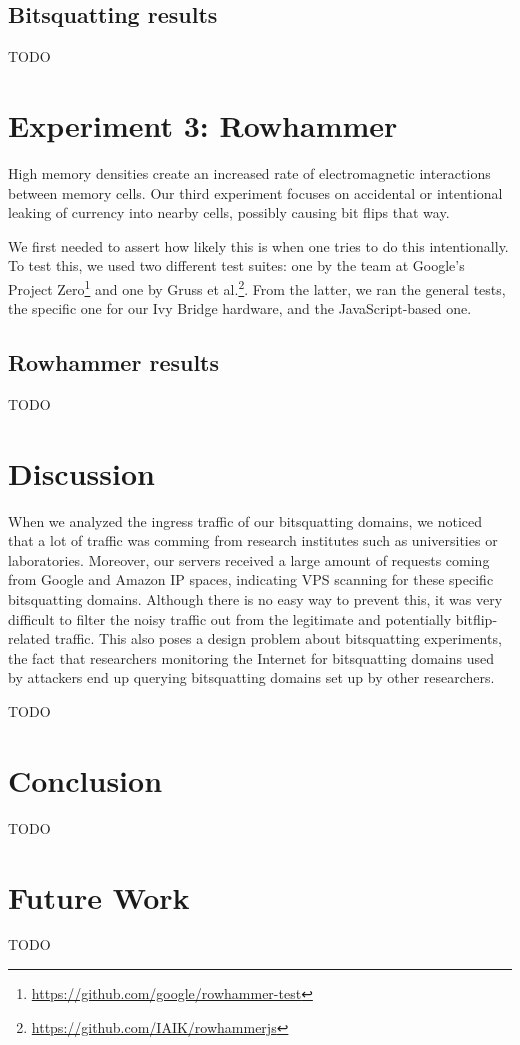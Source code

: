 \documentclass[conference]{IEEEtran}
\begin{document}
\subsection{Bitsquatting results}

TODO


\section{Experiment 3: Rowhammer}

High memory densities create an increased rate of electromagnetic interactions
between memory cells\cite{kim2014flipping}. Our third experiment focuses on
accidental or intentional leaking of currency into nearby cells, possibly
causing bit flips that way.

We first needed to assert how likely this is when one tries to do this
intentionally. To test this, we used two different test suites: one by the team
at Google's Project Zero\footnote{\url{https://github.com/google/rowhammer-test}}
and one by Gruss et al.\cite{gruss2016rowhammer}\footnote{\url{https://github.com/IAIK/rowhammerjs}}.
From the latter, we ran the general tests, the specific one for our Ivy Bridge
hardware, and the JavaScript-based one.


\subsection{Rowhammer results}\label{sec:results}

TODO


\section{Discussion}\label{sec:disc}

When we analyzed the ingress traffic of our bitsquatting domains, we noticed
that a lot of traffic was comming from research institutes such as universities
or laboratories. Moreover, our servers received a large amount of requests
coming from Google and Amazon IP spaces, indicating VPS scanning for these
specific bitsquatting domains.  Although there is no easy way to prevent this,
it was very difficult to filter the noisy traffic out from the legitimate and
potentially bitflip-related traffic. This also poses a design problem about
bitsquatting experiments, the fact that researchers monitoring the Internet for
bitsquatting domains used by attackers end up querying bitsquatting domains set
up by other researchers.

TODO


\section{Conclusion}\label{sec:conc}

TODO


\section{Future Work}\label{sec:futwork}

TODO


\printbibliography
\end{document}
